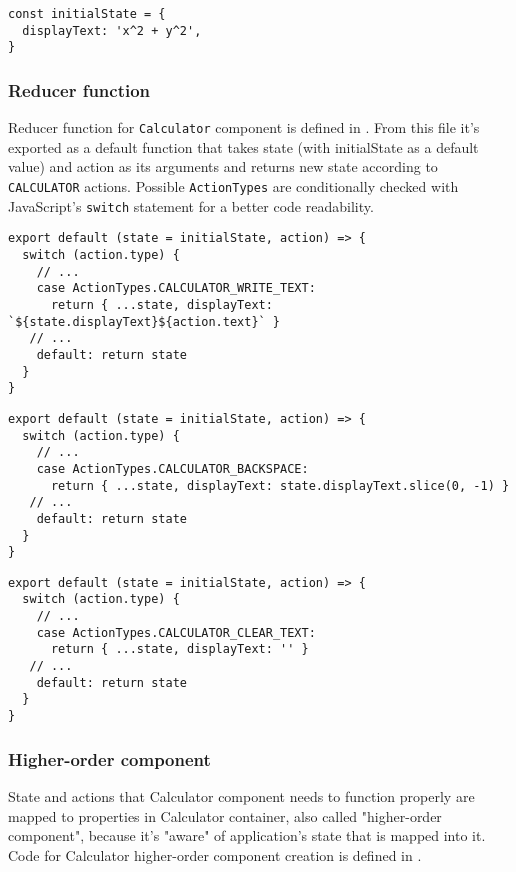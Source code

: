 \begin{lstlisting}[caption={Initial state of a \textsl{calculator}.},captionpos=b]
const initialState = {
  displayText: 'x^2 + y^2',
}
\end{lstlisting}

\subsubsection{Reducer function}
Reducer function for \texttt{Calculator} component is defined in . From this file it's exported as a default function that takes state (with initialState as a default value) and action as its arguments and returns new state according to \texttt{CALCULATOR} actions. Possible \texttt{ActionTypes} are conditionally checked with JavaScript's \texttt{switch} statement for a better code readability.

\begin{lstlisting}[caption={Addition of text to \texttt{state.calculator.displayText}.},captionpos=b]
export default (state = initialState, action) => {
  switch (action.type) {
    // ...
    case ActionTypes.CALCULATOR_WRITE_TEXT:
      return { ...state, displayText: `${state.displayText}${action.text}` }
   // ...
    default: return state
  }
}
\end{lstlisting}

\begin{lstlisting}[caption={Remove one character from  \texttt{state.calculator.displayText}.},captionpos=b]
export default (state = initialState, action) => {
  switch (action.type) {
    // ...
    case ActionTypes.CALCULATOR_BACKSPACE:
      return { ...state, displayText: state.displayText.slice(0, -1) }
   // ...
    default: return state
  }
}
\end{lstlisting}

\begin{lstlisting}[caption={Clear the \texttt{state.calculator.displayText}.},captionpos=b]
export default (state = initialState, action) => {
  switch (action.type) {
    // ...
    case ActionTypes.CALCULATOR_CLEAR_TEXT:
      return { ...state, displayText: '' }
   // ...
    default: return state
  }
}
\end{lstlisting}

\subsubsection{Higher-order component}
State and actions that Calculator component needs to function properly are mapped to properties in Calculator container, also called "higher-order component", because it's "aware" of application's state that is mapped into it. Code for Calculator higher-order component creation is defined in .

